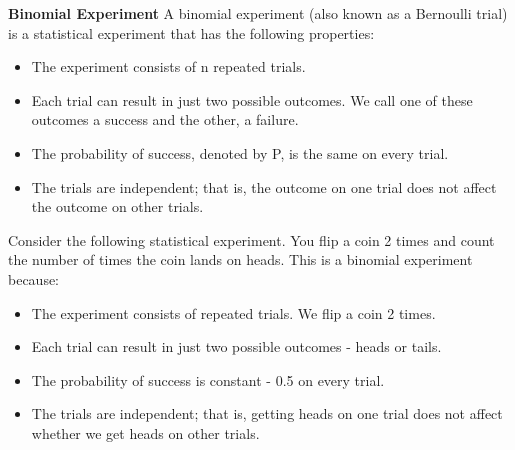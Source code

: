 			\noindent \textbf{Binomial Experiment}
			A binomial experiment (also known as a Bernoulli trial) is a statistical experiment that has the following properties:
			\begin{itemize}
				\item The experiment consists of n repeated trials.
				\item Each trial can result in just two possible outcomes. We call one of these outcomes a success and the other, a failure.
				\item The probability of success, denoted by P, is the same on every trial.
				\item The trials are independent; that is, the outcome on one trial does not affect the outcome on other trials.
			\end{itemize}
			
Consider the following statistical experiment. You flip a coin 2 times and count the number of times the coin lands on heads. This is a binomial experiment because:
						\begin{itemize}
							\item The experiment consists of repeated trials. We flip a coin 2 times.
							\item Each trial can result in just two possible outcomes - heads or tails.
							\item The probability of success is constant - 0.5 on every trial.
							\item The trials are independent; that is, getting heads on one trial does not affect whether we get heads on other trials.
						\end{itemize}





